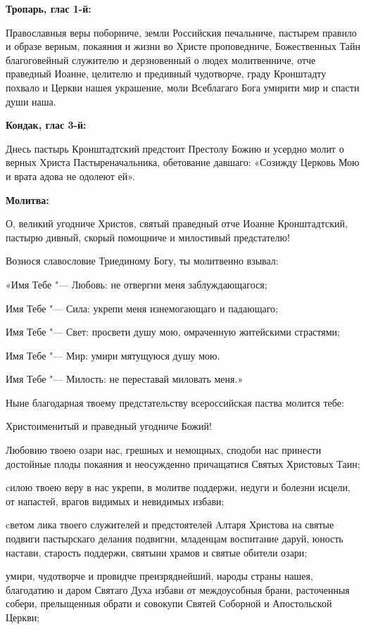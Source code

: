\bfseries Тропарь, глас 1-й:\normalfont{}\nopagebreak


Православныя веры поборниче, земли Российския печальниче, пастырем правило и образе верным, покаяния и жизни во Христе проповедниче, Божественных Тайн благоговейный служителю и дерзновенный о людех молитвенниче, отче праведный Иоанне, целителю и предивный чудотворче, граду Кронштадту похвало и Церкви нашея украшение, моли Всеблагаго Бога умирити мир и спасти души наша.


\medskip


\bfseries Кондак, глас 3-й:\normalfont{}\nopagebreak


Днесь пастырь Кронштадтский предстоит Престолу Божию и усердно молит о верных Христа Пастыреначальника, обетование давшаго: «Созижду Церковь Мою и врата адова не одолеют ей».


\medskip


\bfseries Молитва:\normalfont{}\nopagebreak


О, великий угодниче Христов, святый праведный отче Иоанне Кронштадтский, пастырю дивный, скорый помощниче и милостивый предстателю! 

Вознося славословие Триединому Богу, ты молитвенно взывал: 

«Имя Тебе "--- Любовь: не отвергни меня заблуждающагося;

Имя Тебе "--- Сила: укрепи меня изнемогающаго и падающаго;

Имя Тебе "--- Свет: просвети душу мою, омраченную житейскими страстями;

Имя Тебе "--- Мир: умири мятущуюся душу мою. 

Имя Тебе "--- Милость: не переставай миловать меня.»

Ныне благодарная твоему предстательству всероссийская паства молится тебе: 

Христоименитый и праведный угодниче Божий! 

Любовию твоею озари нас, грешных и немощных, сподоби нас принести достойные плоды покаяния и неосужденно причащатися Святых Христовых Таин;

cилою твоею веру в нас укрепи, в молитве поддержи, недуги и болезни исцели, от напастей, врагов видимых и невидимых избави; 

cветом лика твоего служителей и предстоятелей Aлтаря Христова на святые подвиги пастырскаго делания подвигни, младенцам воспитание даруй, юность настави, старость поддержи, святыни храмов и святые обители озари; 

умири, чудотворче и провидче преизряднейший, народы страны нашея, благодатию и даром Святаго Духа избави от междоусобныя брани, расточенныя собери, прелыщенныя обрати и совокупи Святей Соборной и Апостольской Церкви; 

